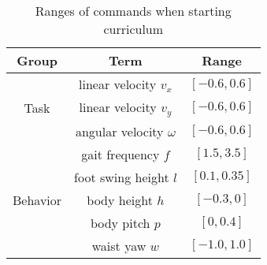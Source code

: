 \begin{table}[t]
\setlength{\abovecaptionskip}{0.cm}
\setlength{\belowcaptionskip}{-0.cm}
    \centering
    \caption{Ranges of commands when starting curriculum} 
    \begin{tabular}{@{}c|cc@{}} \toprule
        Group                              &  Term               &  Range \\ \midrule
        \multirow{3}{*}{Task} & linear velocity $v_x$                 & $[-0.6, 0.6]$ \\
                                  & linear velocity $v_y$                  & $[-0.6, 0.6]$ \\
                                  & angular velocity $\omega$               & $[-0.6, 0.6]$ \\ \midrule
        \multirow{5}{*}{Behavior}     & gait frequency $f$                 & $[1.5, 3.5]$  \\
                                  & foot swing height $l$            & $[0.1, 0.35]$ \\ 
                                  & body height $h$                    & $[-0.3, 0] $  \\
                                  & body pitch $p$                       & $[0, 0.4]$    \\
                                  & waist yaw $w$                     & $[-1.0, 1.0]$ \\ \bottomrule
    \end{tabular}
    \label{tab:curriculum_init_commands}
\end{table}